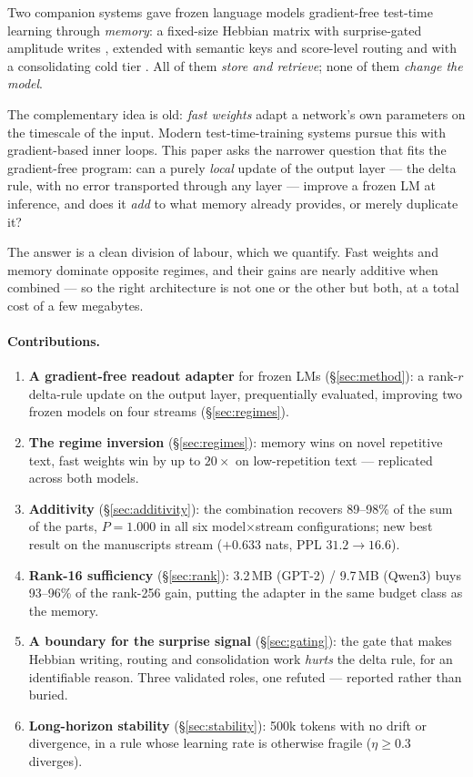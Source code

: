 \documentclass[11pt]{article}
\begin{document}
Two companion systems gave frozen language models gradient-free test-time learning through \emph{memory}: a fixed-size Hebbian matrix with surprise-gated amplitude writes \cite{sillage}, extended with semantic keys and score-level routing \cite{router} and with a consolidating cold tier \cite{hier}. All of them \emph{store and retrieve}; none of them \emph{change the model}.

The complementary idea is old: \emph{fast weights} \cite{hinton1987,schmidhuber1992,ba2016} adapt a network's own parameters on the timescale of the input. Modern test-time-training systems \cite{ttt,titans,ttr} pursue this with gradient-based inner loops. This paper asks the narrower question that fits the gradient-free program: can a purely \emph{local} update of the output layer --- the delta rule, with no error transported through any layer --- improve a frozen LM at inference, and does it \emph{add} to what memory already provides, or merely duplicate it?

The answer is a clean division of labour, which we quantify. Fast weights and memory dominate opposite regimes, and their gains are nearly additive when combined --- so the right architecture is not one or the other but both, at a total cost of a few megabytes.

\paragraph{Contributions.}
\begin{enumerate}[leftmargin=1.5em,itemsep=2pt]
\item \textbf{A gradient-free readout adapter} for frozen LMs (\S\ref{sec:method}): a rank-$r$ delta-rule update on the output layer, prequentially evaluated, improving two frozen models on four streams (\S\ref{sec:regimes}).
\item \textbf{The regime inversion} (\S\ref{sec:regimes}): memory wins on novel repetitive text, fast weights win by up to $20\times$ on low-repetition text --- replicated across both models.
\item \textbf{Additivity} (\S\ref{sec:additivity}): the combination recovers 89--98\% of the sum of the parts, $P = 1.000$ in all six model$\times$stream configurations; new best result on the manuscripts stream ($+0.633$ nats, PPL $31.2 \to 16.6$).
\item \textbf{Rank-16 sufficiency} (\S\ref{sec:rank}): 3.2\,MB (GPT-2) / 9.7\,MB (Qwen3) buys 93--96\% of the rank-256 gain, putting the adapter in the same budget class as the memory.
\item \textbf{A boundary for the surprise signal} (\S\ref{sec:gating}): the gate that makes Hebbian writing, routing and consolidation work \cite{sillage,router,hier} \emph{hurts} the delta rule, for an identifiable reason. Three validated roles, one refuted --- reported rather than buried.
\item \textbf{Long-horizon stability} (\S\ref{sec:stability}): 500k tokens with no drift or divergence, in a rule whose learning rate is otherwise fragile ($\eta \ge 0.3$ diverges).
\end{enumerate}
\end{document}
